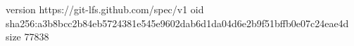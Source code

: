 version https://git-lfs.github.com/spec/v1
oid sha256:a3b8bcc2b84eb5724381e545e9602dab6d1da04d6e2b9f51bffb0e07c24eae4d
size 77838
